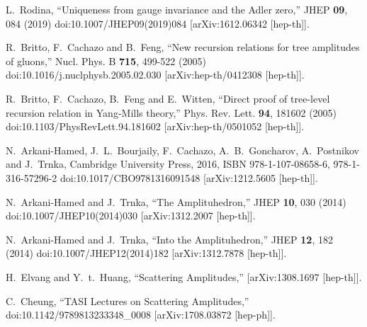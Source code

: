 \documentclass[preprint,showpacs,onecolumn,nofootinbib]{revtex4}
\begin{document}
\begin{thebibliography}{}
L.~Rodina,
``Uniqueness from gauge invariance and the Adler zero,''
JHEP \textbf{09}, 084 (2019)
doi:10.1007/JHEP09(2019)084
[arXiv:1612.06342 [hep-th]].


R.~Britto, F.~Cachazo and B.~Feng,
``New recursion relations for tree amplitudes of gluons,''
Nucl. Phys. B \textbf{715}, 499-522 (2005)
doi:10.1016/j.nuclphysb.2005.02.030
[arXiv:hep-th/0412308 [hep-th]].

R.~Britto, F.~Cachazo, B.~Feng and E.~Witten,
``Direct proof of tree-level recursion relation in Yang-Mills theory,''
Phys. Rev. Lett. \textbf{94}, 181602 (2005)
doi:10.1103/PhysRevLett.94.181602
[arXiv:hep-th/0501052 [hep-th]].


N.~Arkani-Hamed, J.~L.~Bourjaily, F.~Cachazo, A.~B.~Goncharov, A.~Postnikov and J.~Trnka,
Cambridge University Press, 2016,
ISBN 978-1-107-08658-6, 978-1-316-57296-2
doi:10.1017/CBO9781316091548
[arXiv:1212.5605 [hep-th]].

N.~Arkani-Hamed and J.~Trnka,
``The Amplituhedron,''
JHEP \textbf{10}, 030 (2014)
doi:10.1007/JHEP10(2014)030
[arXiv:1312.2007 [hep-th]].

N.~Arkani-Hamed and J.~Trnka,
``Into the Amplituhedron,''
JHEP \textbf{12}, 182 (2014)
doi:10.1007/JHEP12(2014)182
[arXiv:1312.7878 [hep-th]].



H.~Elvang and Y.~t.~Huang,
``Scattering Amplitudes,''
[arXiv:1308.1697 [hep-th]].

C.~Cheung,
``TASI Lectures on Scattering Amplitudes,''
doi:10.1142/9789813233348\_0008
[arXiv:1708.03872 [hep-ph]].


\end{thebibliography}
\end{document}
